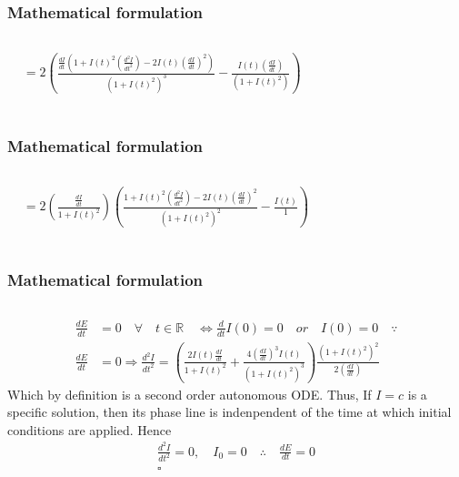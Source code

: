 \documentclass[aspectratio=1610]{beamer}
\begin{document}
\begin{frame}
\frametitle{Mathematical formulation}
\begin{columns}
\column{37em}
\LARGE
\begin{align*}
& = 2\left({\frac{\frac{dI}{dt}\left(1+I(t)^{2}\left(\frac{d^{2}I}{dt^{2}}\right)-2I(t)\left(\frac{dI}{dt}\right)^{2}\right)}{\left(1+I(t)^{2}\right)^{3}}} -   {\frac{I(t)\left(\frac{dI}{dt}\right)}{\left(1+I(t)^{2}\right)}}\right)\\
\end{align*}
\end{columns}
\end{frame}
\begin{frame}
\frametitle{Mathematical formulation}
\begin{columns}
\column{37em}
\LARGE
\begin{align*}
& = 2\left(\frac{\frac{dI}{dt}}{1+I(t)^{2}}\right)   \left({\frac{1+I(t)^{2}\left(\frac{d^{2}I}{dt^{2}}\right)-2I(t)\left(\frac{dI}{dt}\right)^{2}}{\left(1+I(t)^{2}\right)^{2}}} -   {\frac{I(t)}{1}}\right)\\
\end{align*}
\end{columns}
\end{frame}
\begin{frame}
\frametitle{Mathematical formulation}
\begin{columns}
\column{37em}
\large
\begin{align*}
\frac{dE}{dt} & = 0 \quad \forall \quad t \in \mathbb{R} \quad \Longleftrightarrow \frac{d}{dt}I(0) = 0 \quad or \quad I(0)= 0 \quad \because \\
\frac{dE}{dt} &= 0 \Longrightarrow 
{\frac{d^{2}I}{dt^{2}}}=\left(\frac{2I(t)\frac{dI}{dt}}{1+I(t)^{2}}+\frac{4\left(\frac{dI}{dt}\right)^{3}I(t)}{\left(1+I(t)^{2}\right)^{3}}\right)\frac{\left(1+I(t)^{2}\right)^{2}}{2\left(\frac{dI}{dt}\right)}
\end{align*}
Which by definition is a second order autonomous ODE. Thus, If $I=c$ is a specific solution, then its phase line is indenpendent of the time at which initial conditions are applied. Hence
\begin{align*}
\frac{d^{2}I}{dt^{2}}=0,\quad I_{0}=0 \quad \therefore\quad\frac{dE}{dt}=0\\
\square
\end{align*}
\end{columns}
\end{frame}
\end{document}
